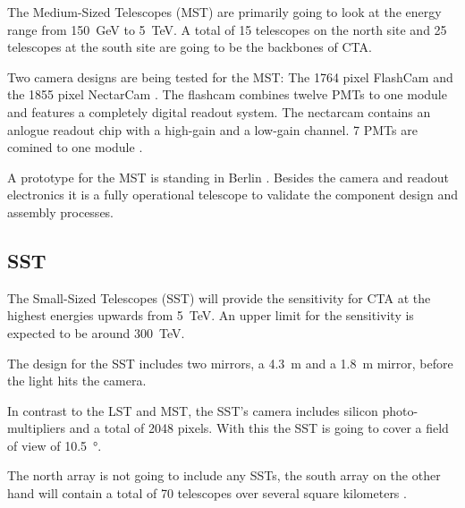 The Medium-Sized Telescopes (MST) are primarily going to look at the 
energy range from \SI{150}{\giga\electronvolt} to \SI{5}{\tera\electronvolt}.
A total of 15 telescopes on the north site and 25 telescopes at the south site 
are going to be the backbones of CTA.

Two camera designs are being tested for the MST:
The 1764 pixel FlashCam and the 1855 pixel NectarCam \cite{cta_web}.
The flashcam combines twelve PMTs to one module and features a completely
digital readout system.
The nectarcam contains an anlogue readout chip with a high-gain and a low-gain
channel. 7 PMTs are comined to one module \cite{doi:10.1063/1.4969023}.

A prototype for the MST is standing in Berlin .
Besides the camera and readout electronics it is a fully operational telescope
to validate the component design and assembly processes.

\subsection{SST}

The Small-Sized Telescopes (SST) will provide the sensitivity for CTA at the 
highest energies upwards from \SI{5}{\tera\electronvolt}.
An upper limit for the sensitivity is expected to be around \SI{300}{\tera\electronvolt}.

The design for the SST includes two mirrors, a \SI{4.3}{\meter} and a \SI{1.8}{\meter}
mirror, before the light hits the camera.

In contrast to the LST and MST, the SST's camera includes silicon photo-multipliers
and a total of 2048 pixels. With this the SST is going to cover a field of view 
of \SI{10.5}{\degree}.

The north array is not going to include any SSTs, the 
south array on the other hand will contain a total of 70 telescopes over
several square kilometers \cite{cta_web}.

